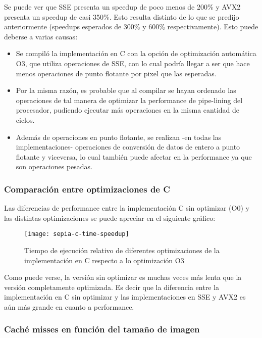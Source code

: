 Se puede ver que SSE presenta un speedup de poco menos de 200\% y AVX2 presenta un speedup de casi 350\%. Esto resulta distinto de lo que se predijo anteriormente (speedups esperados de 300\% y 600\% respectivamente). Esto puede deberse a varias causas: 

\begin{itemize}
    \item Se compiló la implementación en C con la opción de optimización automática O3, que utiliza operaciones de SSE, con lo cual podría llegar a ser que hace menos operaciones de punto flotante por pixel que las esperadas.
    \item Por la misma razón, es probable que al compilar se hayan ordenado las operaciones de tal manera de optimizar la performance de pipe-lining del procesador, pudiendo ejecutar más operaciones en la misma cantidad de ciclos.
    \item Además de operaciones en punto flotante, se realizan -en todas las implementaciones- operaciones de conversión de datos de entero a punto flotante y viceversa, lo cual también puede afectar en la performance ya que son operaciones pesadas.
\end{itemize}

\subsubsection{Comparación entre optimizaciones de C}

Las diferencias de performance entre la implementación C sin optimizar (O0) y las distintas optimizaciones se puede apreciar en el siguiente gráfico:

\begin{figure}[h]
    \centering
    \texttt{[image: sepia-c-time-speedup]}
    \caption{Tiempo de ejecución relativo de diferentes optimizaciones de la implementación en C respecto a lo optimización O3}
    \label{fig:sepia-c-time}
\end{figure}

Como puede verse, la versión sin optimizar es muchas veces más lenta que la versión completamente optimizada. Es decir que la diferencia entre la implementación en C sin optimizar y las implementaciones en SSE y AVX2 es aún más grande en cuanto a performance.

\subsubsection{Caché misses en función del tamaño de imagen}

